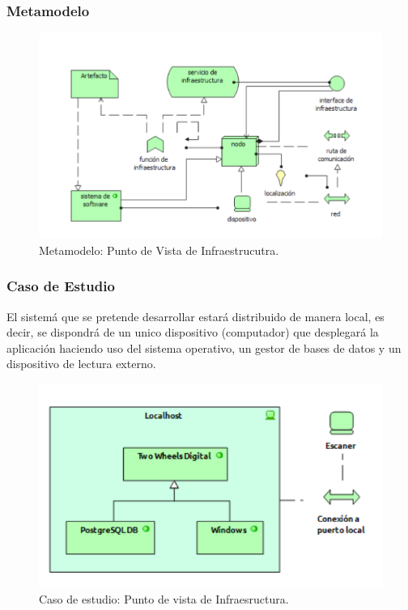 \subsubsection{Metamodelo}
\begin{figure}[H]
	\centering
	\includegraphics[width=1.0\textwidth]{imagenes/Metamodelos/Tecnologia/meta_infraestructura.PDF}
	\caption{Metamodelo: Punto de Vista de Infraestrucutra.}
	\label{fig:gap_analysis}
\end{figure}

\subsubsection{Caso de Estudio}
El sistemá que se pretende desarrollar estará distribuido de manera local, es decir, se dispondrá de un unico dispositivo (computador) que desplegará la aplicación haciendo uso del sistema operativo, un gestor de bases de datos y un dispositivo de lectura externo.


\begin{figure}[H]
	\centering
	\includegraphics[width=1.0\textwidth]{imagenes/Caso_Estudio/Tecnologia/infraestructura.PDF}
	\caption{Caso de estudio: Punto de vista de Infraesructura.}
	\label{fig:gap_analysis}
\end{figure}


